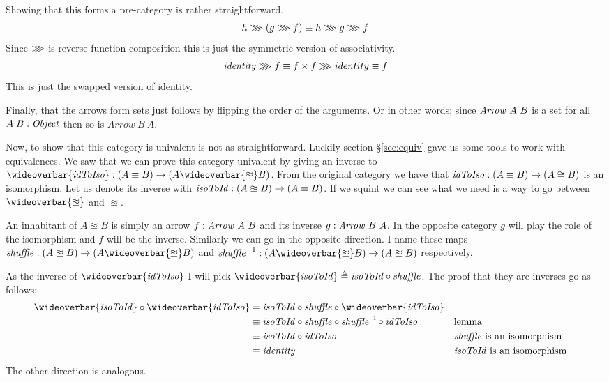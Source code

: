 Showing that this forms a pre-category is rather straightforward. 
%
$$
h \ggg (g \ggg f) \equiv h \ggg g \ggg f
$$
%
Since $\ggg$ is reverse function composition this is just the symmetric version
of associativity.
%
$$
\identity \rrr f \equiv f \x f \rrr identity \equiv f
$$
%
This is just the swapped version of identity.

Finally, that the arrows form sets just follows by flipping the order of the
arguments. Or in other words; since $\Arrow\ A\ B$ is a set for all $A\;B \tp
\Object$ then so is $Arrow\ B\ A$.

Now, to show that this category is univalent is not as straightforward. Luckily
section \S\ref{sec:equiv} gave us some tools to work with equivalences. We saw
that we can prove this category univalent by giving an inverse to
$\wideoverbar{\idToIso} \tp (A \equiv B) \to (A \wideoverbar{\approxeq} B)$.
From the original category we have that $\idToIso \tp (A \equiv B) \to (A \cong
B)$ is an isomorphism. Let us denote its inverse with $\isoToId \tp (A
\approxeq B) \to (A \equiv B)$. If we squint we can see what we need is a way to
go between $\wideoverbar{\approxeq}$ and $\approxeq$.

An inhabitant of $A \approxeq B$ is simply an arrow $f \tp \Arrow\ A\ B$
and its inverse $g \tp \Arrow\ B\ A$. In the opposite category $g$ will
play the role of the isomorphism and $f$ will be the inverse. Similarly we can
go in the opposite direction. I name these maps $\shufflef \tp (A \approxeq
B) \to (A \wideoverbar{\approxeq} B)$ and $\shufflef^{-1} \tp (A
\wideoverbar{\approxeq} B) \to (A \approxeq B)$ respectively.

As the inverse of $\wideoverbar{\idToIso}$ I will pick $\wideoverbar{\isoToId}
\defeq \isoToId \comp \shufflef$. The proof that they are inverses go as
follows:
%
\begin{align*}
\wideoverbar{\isoToId} \comp \wideoverbar{\idToIso} & =
\isoToId \comp \shufflef \comp \wideoverbar{\idToIso}
\\
%
& \equiv
\isoToId \comp \shufflef \comp \inv{\shufflef} \comp \idToIso
&& \text{lemma} \\
& \equiv
\isoToId \comp \idToIso
&& \text{$\shufflef$ is an isomorphism} \\
& \equiv
\identity
&& \text{$\isoToId$ is an isomorphism}
\end{align*}
%
The other direction is analogous.

